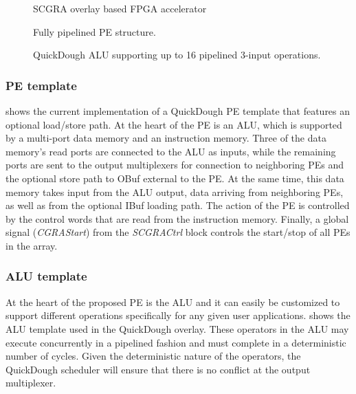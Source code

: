 \begin{figure}[tb]
\vspace{-1em}
    \caption{SCGRA overlay based FPGA accelerator}
    \label{fig:scgra-accelerator}
\end{figure}

\begin{figure}[tb]
\center{\texttt{[image: pe]}}
\caption{Fully pipelined PE structure.}
\label{fig:pe}
\end{figure}

\begin{figure}[tb]
\caption{QuickDough ALU supporting up to 16 pipelined 3-input operations.}
\label{fig:ALU}
\vspace{-1em}
\end{figure} 

\subsubsection{PE template}
 shows the current implementation of a QuickDough PE template that features an optional load/store path. At the heart of the PE is an ALU, which is supported by a multi-port data memory and an instruction memory. Three of the data memory's read ports are connected to the ALU as inputs, while the remaining ports are sent to the output multiplexers for connection to neighboring PEs and the optional store path to OBuf external to the PE. At the same time, this data memory takes input from the ALU output, data arriving from neighboring PEs, as well as from the optional IBuf loading path. The action of the PE is controlled by the control words that are read from the instruction memory. Finally, a global signal (\emph{CGRAStart}) from the \emph{SCGRACtrl} block controls the start/stop of all PEs in the array.

\subsubsection{ALU template}
At the heart of the proposed PE is the ALU and it can easily be customized to support different operations specifically for any given user applications.  shows the ALU template used in the QuickDough overlay. These operators in the ALU may execute concurrently in a pipelined fashion and must complete in a deterministic number of cycles. Given the deterministic nature of the operators, the QuickDough scheduler will ensure that there is no conflict at the output multiplexer.

